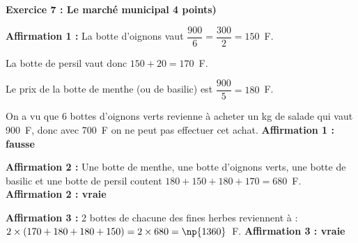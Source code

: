 \textbf{Exercice 7 : Le marché municipal \hfill 4 points) }

\medskip

%
%


\textbf{Affirmation 1 :} %
La botte d'oignons vaut $\dfrac{900}{6} = \dfrac{300}{2} = 150$~F.

La botte de persil vaut donc $150 + 20 = 170$~F.

Le prix de la botte de menthe (ou de basilic) est $\dfrac{900}{5} = 180$~F.

On a vu que 6 bottes d'oignons verts revienne à acheter un kg de salade qui vaut 900~F, donc avec 700~F on ne peut pas effectuer cet achat. \textbf{Affirmation 1 : fausse}

\textbf{Affirmation 2 :} %
Une botte de menthe, une botte d'oignons verts, une botte de basilic et une botte de persil coutent $180 + 150 + 180 + 170 = 680$~F. \textbf{Affirmation 2 : vraie}

\textbf{Affirmation 3 :} %
2 bottes de chacune des fines herbes reviennent à : $2\times (170 + 180 + 180 + 150) = 2 \times 680 = \np{1360}$~F. \textbf{Affirmation 3 : vraie}
\vspace{0,5cm}

